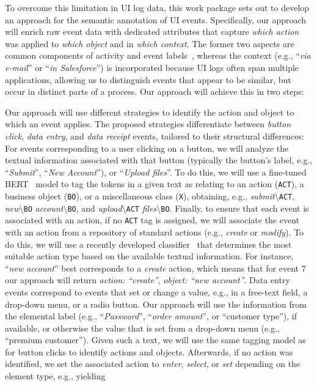 To overcome this limitation in UI log data, this work package sets out to develop an approach for the semantic annotation of UI events. Specifically, our approach will enrich raw event data with dedicated attributes that capture
 \textit{which action} was applied to \textit{which object} and in \textit{which context}. The former two aspects are common components of activity and event labels~\cite{mendling2010activity,leopold2019using}, whereas the context (e.g., ``\textit{via e-mail}'' or ``\textit{in Salesforce}'') is incorporated because UI logs often span multiple applications, allowing us to distinguish events that appear to be similar, but occur in distinct parts of a process. 
 Our approach will achieve this in two steps:


 Our approach will use different strategies to identify the action and object to which an event applies. The proposed strategies differentiate between \textit{button click},  \textit{data entry}, and \textit{data receipt} events, tailored to their structural differences:
%
  For events corresponding to a user clicking on a button, we will analyze the textual information associated with that button (typically the button's label, e.g., ``\textit{Submit}'', ``\textit{New Account}''), or ``\textit{Upload files}''. To do this, we will use a fine-tuned BERT~\cite{Devlin2019} model to tag the tokens in a given text as relating to an action (\texttt{ACT}), a business object (\texttt{BO}), or a miscellaneous class (\texttt{X}), obtaining, e.g., \textit{submit}\textbackslash\texttt{ACT}, \textit{new}\textbackslash\texttt{BO} \textit{account}\textbackslash\texttt{BO}, and \textit{upload}\textbackslash\texttt{ACT} \textit{files}\textbackslash\texttt{BO}.
Finally, to ensure that each event is associated with an action, if no \texttt{ACT} tag is assigned, we will associate the event with an action from a repository of standard actions (e.g., \textit{create} or \textit{modify}). To do this, we will use a recently developed classifier~\cite{rebmann2022enabling} that determines the most suitable action type based on the available textual information. For instance, ``\textit{new account}'' best corresponds to a \textit{create} action, which means that for event 7 our approach will return \textit{action: ``create''}, \textit{object: ``new account''}.
%
 Data entry events correspond to events that set or change a value, e.g., in a free-text field, a drop-down menu, or a radio button. Our approach will use the information from the elemental label (e.g., ``\textit{Password}'', ``\textit{order amount}'', or ``customer type''), if available, or otherwise the value that is set from a drop-down menu (e.g., ``premium customer''). Given such a text, we will use the same tagging model as for button clicks to identify actions and objects. Afterwards, if no action was identified, we  set the associated action to \textit{enter}, \textit{select}, or \textit{set} depending on the element type, e.g., yielding 
